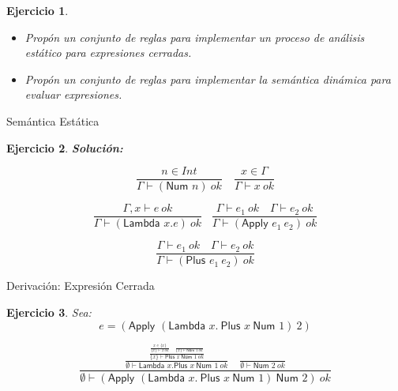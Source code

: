 \documentclass[11pt]{beamer}
\newtheorem{exercise}{Ejercicio}
\begin{document}
\begin{frame}
	\begin{exercise}
		\begin{itemize}
			\item{Propón un conjunto de reglas para implementar un proceso de análisis estático para expresiones cerradas.} \\[1em]
			\item{Propón un conjunto de reglas para implementar la semántica dinámica para evaluar expresiones.}
		\end{itemize}
	\end{exercise}
\end{frame}

\begin{frame}{Semántica Estática}
	\begin{exercise}
		\textbf{Solución: }
		
		\[
		\frac{n \in Int}{\Gamma \vdash (\textsf{Num } n)\ ok}
		\quad
		\frac{x \in \Gamma}{\Gamma \vdash x\ ok}
		\]
		
		\[
		\frac{\Gamma, x \vdash e\ ok}{\Gamma \vdash (\textsf{Lambda } x.e)\ ok} \; \; \;
		\frac{\Gamma \vdash e_1\ ok \quad \Gamma \vdash e_2\ ok}
		{\Gamma \vdash (\textsf{Apply } e_1\ e_2)\ ok}
		\]
		
		\[
		\frac{\Gamma \vdash e_1\ ok \quad \Gamma \vdash e_2\ ok}
		{\Gamma \vdash (\textsf{Plus } e_1\ e_2)\ ok}
		\]
	\end{exercise}
\end{frame}

\begin{frame}{Derivación: Expresión Cerrada}
	\begin{exercise}
		Sea:
		\[
		e = (\textsf{Apply } (\textsf{Lambda } x.\ \textsf{Plus } x\ \textsf{Num } 1)\ 2)
		\]
		
		\[
		\frac{
			\frac{
				\frac{
					\frac{x \in \{x\}}{\{x\} \vdash x\ ok}
					\quad
					\frac{}{\{x\} \vdash \textsf{Num } 1\ ok}
				}{\{x\} \vdash \textsf{Plus } x\ \textsf{Num } 1\ ok}
			}{\emptyset \vdash \textsf{Lambda } x.\textsf{Plus } x\ \textsf{Num } 1\ ok}
			\quad
			\frac{}{\emptyset \vdash \textsf{Num } 2\ ok}
		}{
			\emptyset \vdash  (\textsf{Apply } (\textsf{Lambda } x.\ \textsf{Plus } x\ \textsf{Num } 1)\ \textsf{Num }2)\ ok
		}
		\]
		
	\end{exercise}
\end{frame}
\end{document}
